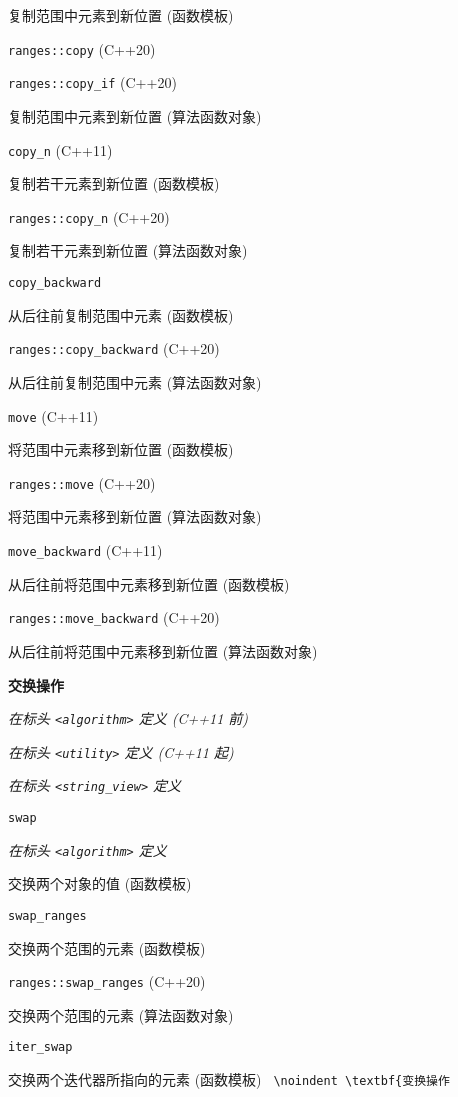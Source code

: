 复制范围中元素到新位置 (函数模板)

\noindent \lstinline{ranges::copy} (C++20)

\noindent \lstinline{ranges::copy_if} (C++20)

复制范围中元素到新位置 (算法函数对象)

\noindent \lstinline{copy_n} (C++11)

复制若⼲元素到新位置 (函数模板)

\noindent \lstinline{ranges::copy_n} (C++20)

复制若⼲元素到新位置 (算法函数对象)

\noindent \lstinline{copy_backward} 

从后往前复制范围中元素 (函数模板)

\noindent \lstinline{ranges::copy_backward} (C++20)

从后往前复制范围中元素 (算法函数对象)

\noindent \lstinline{move} (C++11)

将范围中元素移到新位置 (函数模板)

\noindent \lstinline{ranges::move} (C++20)

将范围中元素移到新位置 (算法函数对象)

\noindent \lstinline{move_backward} (C++11)

从后往前将范围中元素移到新位置 (函数模板)

\noindent \lstinline{ranges::move_backward} (C++20)

从后往前将范围中元素移到新位置 (算法函数对象)

\noindent \textbf{交换操作} 

\textit{在标头 \lstinline{<algorithm>} 定义 (C++11 前)}

\textit{在标头 \lstinline{<utility>} 定义 (C++11 起)}

\textit{在标头 \lstinline{<string_view>} 定义}

\noindent \lstinline{swap} 

\textit{在标头 \lstinline{<algorithm>} 定义}

交换两个对象的值 (函数模板)

\noindent \lstinline{swap_ranges} 

交换两个范围的元素 (函数模板)

\noindent \lstinline{ranges::swap_ranges} (C++20) 

交换两个范围的元素 (算法函数对象)

\noindent \lstinline{iter_swap} 

交换两个迭代器所指向的元素 (函数模板)
\noindent \lstinline{
\noindent \textbf{变换操作}

